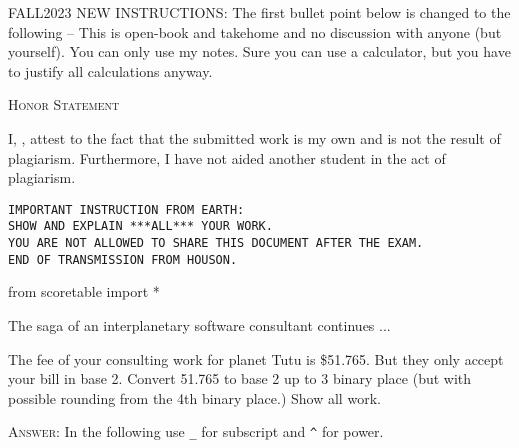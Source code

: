 

\renewcommand\AUTHOR{jdoe5@cougars.ccis.edu} %


\topmattertwo

FALL2023 NEW INSTRUCTIONS:
The first bullet point below is changed to the following --
This is open-book and takehome and no discussion with
anyone (but yourself).
You can only use my notes.
Sure you can use a calculator, but you have to justify all calculations
anyway.




\begin{center}
  \textsc{Honor Statement}
\end{center}
I, ,
attest to the fact that the submitted work is my own and
is not the result of plagiarism.
Furthermore, I have not aided another student in the act of
plagiarism.


\newpage
\texttt{IMPORTANT INSTRUCTION FROM EARTH:
\\
SHOW AND EXPLAIN ***ALL*** YOUR WORK.
\\
YOU ARE NOT ALLOWED TO SHARE THIS DOCUMENT AFTER THE EXAM.
\\
END OF TRANSMISSION FROM HOUSON.
}

\begin{python}
from scoretable import *
\end{python}

\newpage


\newpage
\nextq
The saga of an interplanetary software consultant continues ...

The fee of your consulting work for planet Tutu is \$51.765.
But they only accept your bill in base 2.
Convert 51.765 to base 2 up to 3 binary place (but with possible rounding
from the 4th binary place.) Show all work.

\textsc{Answer:}
In the following use \verb!_! for subscript and \verb!^! for power.

